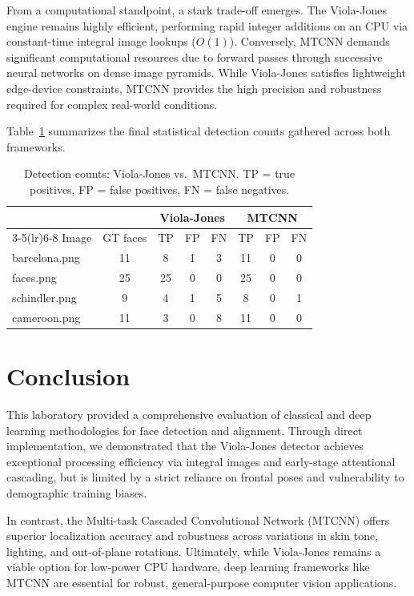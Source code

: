 \documentclass{article}
\begin{document}
From a computational standpoint, a stark trade-off emerges. The Viola-Jones engine remains highly efficient, performing rapid integer additions on an CPU via constant-time integral image lookups ($O(1)$). Conversely, MTCNN demands significant computational resources due to forward passes through successive neural networks on dense image pyramids. While Viola-Jones satisfies lightweight edge-device constraints, MTCNN provides the high precision and robustness required for complex real-world conditions.

Table~\ref{tab:comparison} summarizes the final statistical detection counts gathered across both frameworks.

\begin{table}[H]
\centering
\caption{Detection counts: Viola-Jones vs.\ MTCNN.
TP = true positives, FP = false positives, FN = false negatives.}
\label{tab:comparison}
\begin{tabular}{lccccccc}
\toprule
& & \multicolumn{3}{c}{Viola-Jones} & \multicolumn{3}{c}{MTCNN} \\
\cmidrule(lr){3-5}\cmidrule(lr){6-8}
Image & GT faces & TP & FP & FN & TP & FP & FN \\
\midrule
barcelona.png & 11 & 8  & 1  & 3  & 11 & 0  & 0  \\
faces.png     & 25 & 25 & 0  & 0  & 25 & 0  & 0  \\
schindler.png & 9  & 4  & 1  & 5  & 8  & 0  & 1  \\
cameroon.png  & 11 & 3  & 0  & 8  & 11 & 0  & 0  \\
\bottomrule
\end{tabular}
\end{table}

\section{Conclusion}
\label{sec:Conclusion}

This laboratory provided a comprehensive evaluation of classical and deep learning methodologies for face detection and alignment. Through direct implementation, we demonstrated that the Viola-Jones detector achieves exceptional processing efficiency via integral images and early-stage attentional cascading, but is limited by a strict reliance on frontal poses and vulnerability to demographic training biases. 

In contrast, the Multi-task Cascaded Convolutional Network (MTCNN) offers superior localization accuracy and robustness across variations in skin tone, lighting, and out-of-plane rotations. Ultimately, while Viola-Jones remains a viable option for low-power CPU hardware, deep learning frameworks like MTCNN are essential for robust, general-purpose computer vision applications.



\end{document}
